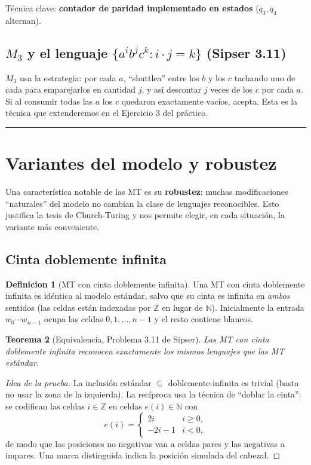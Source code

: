 \documentclass[11pt,a4paper]{article}
\theoremstyle{plain}
\newtheorem{teorema}{Teorema}[section]
\theoremstyle{definition}
\newtheorem{definicion}[teorema]{Definicion}
\theoremstyle{remark}
\begin{document}
T\'ecnica clave: \textbf{contador de paridad implementado en estados}
($q_3,q_4$ alternan).

\subsection{$M_3$ y el lenguaje $\{a^ib^jc^k : i\cdot j = k\}$ (Sipser 3.11)}

$M_3$ usa la estrategia: por cada $a$, ``shuttlea'' entre los $b$ y los $c$
tachando uno de cada para emparejarlos en cantidad $j$, y as\'i descontar
$j$ veces de los $c$ por cada $a$. Si al consumir todas las $a$ los $c$
quedaron exactamente vac\'ios, acepta. Esta es la t\'ecnica que extenderemos
en el Ejercicio 3 del pr\'actico.

\bigskip\hrule\bigskip

\section{Variantes del modelo y robustez}
\label{sec:variantes}

Una caracter\'istica notable de las MT es su \textbf{robustez}: muchas
modificaciones ``naturales'' del modelo no cambian la clase de lenguajes
reconocibles. Esto justifica la tesis de Church-Turing y nos permite
elegir, en cada situaci\'on, la variante m\'as conveniente.

\subsection{Cinta doblemente infinita}

\begin{definicion}[MT con cinta doblemente infinita]
Una MT con cinta doblemente infinita es id\'entica al modelo est\'andar,
salvo que su cinta es infinita en \emph{ambos} sentidos (las celdas est\'an
indexadas por $\mathbb Z$ en lugar de $\mathbb N$). Inicialmente la entrada
$w_0\cdots w_{n-1}$ ocupa las celdas $0,1,\dots,n-1$ y el resto contiene
blancos.
\end{definicion}

\begin{teorema}[Equivalencia, Problema 3.11 de Sipser]
\label{teo:doblemente-infinita}
Las MT con cinta doblemente infinita reconocen exactamente los mismos
lenguajes que las MT est\'andar.
\end{teorema}

\begin{proof}[Idea de la prueba]
La inclusi\'on est\'andar $\subseteq$ doblemente-infinita es trivial (basta
no usar la zona de la izquierda). La rec\'iproca usa la t\'ecnica de
``doblar la cinta'': se codifican las celdas $i\in\mathbb Z$ en celdas
$e(i)\in\mathbb N$ con
\[
  e(i) = \begin{cases} 2i & i\ge 0,\\ -2i-1 & i<0,\end{cases}
\]
de modo que las posiciones no negativas van a celdas pares y las negativas
a impares. Una marca distinguida indica la posici\'on simulada del cabezal.
\end{proof}
\end{document}
